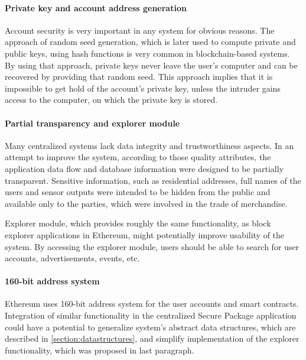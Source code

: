 \paragraph{Private key and account address generation}
Account security is very important in any system for obvious reasons. The approach of random seed generation, which is later used to compute private and public keys, using hash functions is very common in blockchain-based systems. By using that approach, private keys never leave the user's computer and can be recovered by providing that random seed. This approach implies that it is impossible to get hold of the account's private key, unless the intruder gains access to the computer, on which the private key is stored.

\paragraph{Partial transparency and explorer module}
Many centralized systems lack data integrity and trustworthiness aspects. In an attempt to improve the system, according to those quality attributes, the application data flow and database information were designed to be partially transparent. Sensitive information, such as residential addresses, full names of the users and sensor outputs were intended to be hidden from the public and available only to the parties, which were involved in the trade of merchandise.

Explorer module, which provides roughly the same functionality, as block explorer applications in Ethereum, might potentially improve usability of the system. By accessing the explorer module, users should be able to search for user accounts, advertisements, events, etc.

\paragraph{160-bit address system}
Ethereum uses 160-bit address system for the user accounts and smart contracts. Integration of similar functionality in the centralized Secure Package application could have a potential to generalize system's abstract data structures, which are described in \ref{section:datastructures}, and simplify implementation of the explorer functionality, which was proposed in last paragraph.

